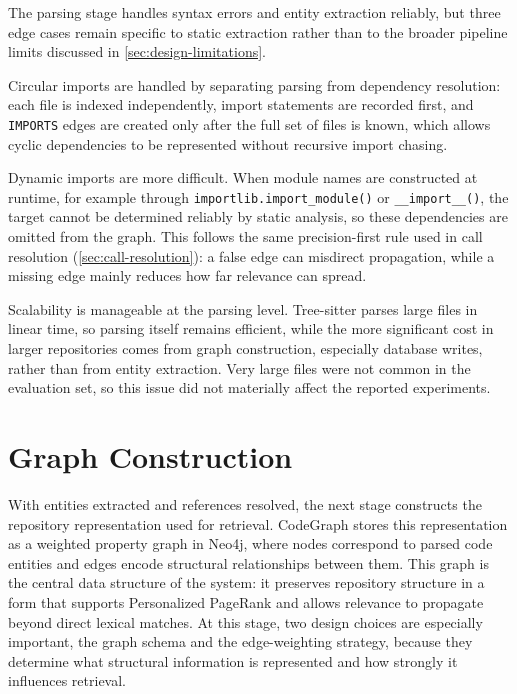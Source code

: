 The parsing stage handles syntax errors and entity extraction reliably, but three edge cases remain specific to static extraction rather than to the broader pipeline limits discussed in \cref{sec:design-limitations}.

Circular imports are handled by separating parsing from dependency resolution: each file is indexed independently, import statements are recorded first, and \texttt{IMPORTS} edges are created only after the full set of files is known, which allows cyclic dependencies to be represented without recursive import chasing.

Dynamic imports are more difficult. When module names are constructed at runtime, for example through \texttt{importlib.import\_module()} or \texttt{\_\_import\_\_()}, the target cannot be determined reliably by static analysis, so these dependencies are omitted from the graph. This follows the same precision-first rule used in call resolution (\cref{sec:call-resolution}): a false edge can misdirect propagation, while a missing edge mainly reduces how far relevance can spread.

Scalability is manageable at the parsing level. Tree-sitter parses large files in linear time, so parsing itself remains efficient, while the more significant cost in larger repositories comes from graph construction, especially database writes, rather than from entity extraction. Very large files were not common in the evaluation set, so this issue did not materially affect the reported experiments.


\section{Graph Construction}
\label{sec:graph-construction}

With entities extracted and references resolved, the next stage constructs the repository representation used for retrieval. CodeGraph stores this representation as a weighted property graph in Neo4j, where nodes correspond to parsed code entities and edges encode structural relationships between them. This graph is the central data structure of the system: it preserves repository structure in a form that supports Personalized PageRank and allows relevance to propagate beyond direct lexical matches. At this stage, two design choices are especially important, the graph schema and the edge-weighting strategy, because they determine what structural information is represented and how strongly it influences retrieval.

